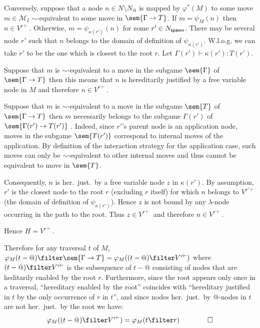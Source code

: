 Conversely, suppose that a node $n \in N\setminus N_@$ is mapped by
$\varphi^*(M)$ to some move $m\in \mathcal{M}_I$ $\sim$-equivalent
to some move in $\sem{\Gamma \rightarrow T}$.
 If $m = \psi_M(n)$ then $n\in V^{r\vdash}$. Otherwise,
$m = \psi_{\kappa(r')}(n)$ for some $r' \in N_{\sf spawn}$. There
may be several node $r'$ such that $n$ belongs to the domain of
definition of $\psi_{\kappa(r')}$. W.l.o.g. we can take $r'$ to be
the one which is closest to the root $r$. Let $\Gamma(r') \vdash
\kappa(r') : T(r')$.
    \begin{compactitem}
    \item Suppose that $m$ is $\sim$-equivalent to a move in the subgame $\sem{\Gamma}$ of $\sem{\Gamma \rightarrow T}$
    then this means that $n$ is hereditarily justified by a free variable node in $M$ and therefore $n \in V^{r\vdash}$.

    \item Suppose that $m$ is $\sim$-equivalent to a move in the subgame $\sem{T}$ of $\sem{\Gamma \rightarrow T}$
    then $m$ necessarily belongs to the subgame $\Gamma(r')$ of $\sem{\Gamma(r')\rightarrow T(r')}$ .
    Indeed, since $r'$'s parent node is an application node, moves in the subgame
    $\sem{T(r')}$ correspond to internal moves of the application. By definition of
    the interaction strategy for the application case, such moves can only be $\sim$-equivalent to other internal
    moves and thus cannot be equivalent to move in $\sem{T}$.

    Consequently, $n$ is her.\ just.\ by a free variable node $z$ in $\kappa(r')$. By assumption, $r'$ is the closest node to the root $r$ (excluding $r$ itself) for which $n$ belongs to $V^{r'\vdash}$ (the domain of definition of $\psi_{\kappa(r')}$). Hence $z$ is not bound by any $\lambda$-node occurring in the path to the root. Thus $z\in
    V^{r\vdash}$ and therefore $n \in V^{r\vdash}$.
    \end{compactitem}
Hence $H = V^{r\vdash}$.

Therefore for any traversal $t$ of $M$, $\varphi_M(t-@) \filter
\sem{\Gamma \rightarrow T} = \varphi_M((t-@)\filter V^{r\vdash})$
where $(t-@)\filter V^{r\vdash}$ is the subsequence of $t-@$
consisting of nodes that are heditarily enabled by the root $r$.
Furthermore, since the root appears only once in a traversal,
``hereditary enabled by the root'' coincides with ``hereditary
justified in $t$ by the only occurrence of $r$ in $t$'', and since
nodes her.\ just.\  by @-nodes in $t$ are not her.\ just.\  by the
root we have:
$$\varphi_M((t-@)\filter V^{r\vdash}) = \varphi_M(t\filter r) \qquad \qed$$


